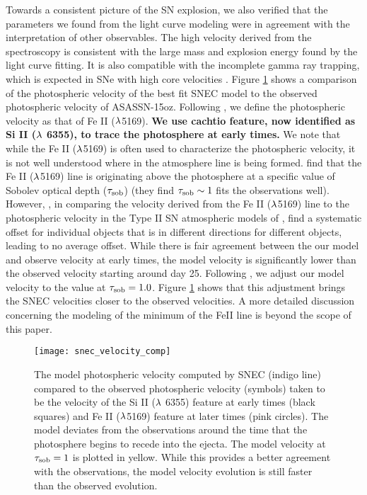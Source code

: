 \documentclass[a4paper,fleqn,usenatbib]{mnras}
\begin{document}
Towards a consistent picture of the SN explosion, we also verified that the parameters we found from the light curve modeling were in agreement with the interpretation of other observables.
The high velocity derived from the spectroscopy is consistent with the large mass and explosion energy found by the light curve fitting.
It is also compatible with the incomplete gamma ray trapping, which is expected in SNe with high core velocities \citep{2011jerkstrand}.
Figure \ref{fig:SNECVelocityCompare} shows a comparison of the photospheric velocity of the best fit SNEC model to the observed photospheric velocity of ASASSN-15oz.
Following \citet{2014faran}, we define the photospheric velocity as that of Fe II ($\rm{\lambda}$5169). 
\textbf{We use cachtio feature, now identified as Si II ($\rm{\lambda}$ 6355), to trace the photosphere at early times.}
We note that while the Fe II ($\rm{\lambda}$5169) is often used to characterize the photospheric velocity, it is not well understood where in the atmosphere line is being formed. 
\citet{2018paxton} find that the Fe II ($\rm{\lambda}$5169) line is originating above the photosphere at a specific value of Sobolev optical depth ($\rm{\tau_{sob}}$) (they find $\rm{\tau_{sob} \sim1}$ fits the observations well).
However, \citet{2001hamuy}, in comparing the velocity derived from the Fe II ($\rm{\lambda}$5169) line to the photospheric velocity in the Type II SN atmospheric models of \citet{1996eastman}, find a systematic offset for individual objects that is in different directions for different objects, leading to no average offset. 
While there is fair agreement between the our model and observe velocity at early times, the model velocity is significantly lower than the observed velocity starting around day 25.
Following \citet{2018paxton}, we adjust our model velocity to the value at $\rm{\tau_{sob} = 1.0}$. 
Figure \ref{fig:SNECVelocityCompare} shows that this adjustment brings the SNEC velocities closer to the observed velocities.
A more detailed discussion concerning the modeling of the minimum of the FeII line is beyond the scope of this paper.
\begin{figure}
\begin{center}
\texttt{[image: snec\_velocity\_comp]} %
\caption{The model photospheric velocity computed by SNEC (indigo line) compared to the observed photospheric velocity (symbols) taken to be the velocity of the Si II ($\rm{\lambda}$ 6355) feature at early times (black squares) and Fe II ($\rm{\lambda}$5169) feature at later times (pink circles). 
The model deviates from the observations around the time that the photosphere begins to recede into the ejecta.
The model velocity at $\rm{\tau_{sob}=1}$ is plotted in yellow. 
While this provides a better agreement with the observations, the model velocity evolution is still faster than the observed evolution.
}
\label{fig:SNECVelocityCompare}
\end{center}
\end{figure}
\end{document}
